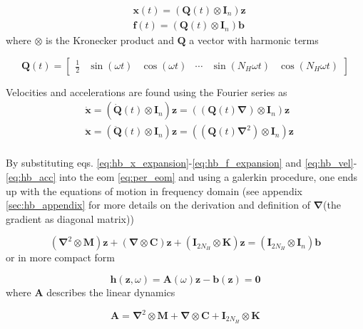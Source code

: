 \begin{align}
  \label{eq:hm_x_compact}
  &\bm x(t) = (\bm Q(t) \otimes \bm I_n) \bm z \\
  \label{eq:hb_y_compact}
  &\bm f(t) = (\bm Q(t) \otimes \bm I_n) \bm b
\end{align}
where $\otimes$ is the Kronecker product and $\bm Q$ a vector with harmonic terms

\begin{equation}
  \label{eq:hb_Q}
  \bm Q(t) =
  \begin{bmatrix}
    \frac{1}{2} & \sin(\omega t) & \cos(\omega t) & \cdots & \sin(N_H \omega t) &
    \cos(N_H \omega t)
  \end{bmatrix}
\end{equation}

Velocities and accelerations are found using the Fourier series as
\begin{align}
  \label{eq:hb_vel}
  &\dot{\bm x} = \left( \dot{\bm Q}(t) \otimes \bm I_n \right) \bm z =
    \left( (\bm Q(t) \bm \nabla) \otimes \bm I_n \right) \bm z \\
  \label{eq:hb_acc}
  &\ddot{\bm x} = \left( \ddot{\bm Q}(t) \otimes \bm{I}_n \right) \bm z =
    \left( (\bm Q(t) \bm \nabla^2) \otimes \bm{I}_n \right) \bm z \\
\end{align}

By substituting eqs. \eqref{eq:hb_x_expansion}-\eqref{eq:hb_f_expansion} and
\eqref{eq:hb_vel}-\eqref{eq:hb_acc} into the eom \eqref{eq:per_eom} and using a
galerkin procedure, one ends up with the equations of motion in frequency
domain (see appendix \ref{sec:hb_appendix} for more details on the derivation
and definition of $\bm \nabla$(the gradient as diagonal matrix))

\begin{equation}
  \label{eq:hb_feom}
  (\bm \nabla^2 \otimes \bm M)\bm z + (\bm \nabla \otimes \bm C)\bm z +
  (\bm{I}_{2N_H} \otimes \bm K)\bm z =
  (\bm{I}_{2N_H} \otimes \bm{I}_n )\bm b
\end{equation}
or in more compact form

\begin{equation}
  \label{eq:hb_feom_compact}
  \bm h(\bm z, \omega) = \bm A(\omega) \bm z - \bm b(\bm z) = \bm 0
\end{equation}
where $\bm A$ describes the linear dynamics

\begin{equation}
  \label{eq:hb_A}
  \bm A = \bm \nabla^2 \otimes \bm M + \bm \nabla \otimes \bm C +
  \bm{I}_{2N_H} \otimes \bm K
\end{equation}

